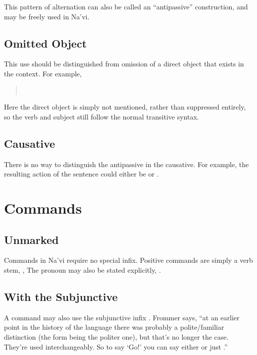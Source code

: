 \noindent This pattern of alternation can also be called an
``antipassive'' construction, and may be freely used in Na'vi.

\subsection{Omitted Object} This use should be distinguished from
omission of a direct object that exists in the context. For example,

\begin{quotation}
\noindent{} \\
\noindent{} 
\end{quotation}

\noindent Here the direct object is simply not mentioned, rather than
suppressed entirely, so the verb and subject still follow the normal
transitive syntax.

\subsection{Causative} There is no way to distinguish the antipassive
in the causa\-tive.  For example, the resulting action of the sentence
  could either be 
 or  .


\section{Commands}
\subsection{Unmarked} Commands in Na'vi require no special infix.
Positive commands are simply a verb stem,  , 
   The pronoun may also be stated
explicitly,  .

\subsection{With the Subjunctive} A command may also use the
subjunctive infix . Frommer says, ``at an earlier point in
the history of the language there was probably a polite/familiar
distinction (the  form being the politer one), but that's no
longer the case. They're used interchangeably.  So to say `Go!' you can
say either  or just .''

